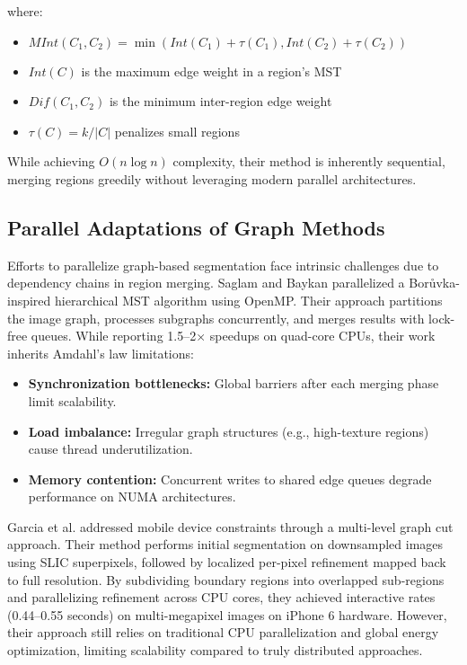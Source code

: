 \documentclass[conference]{IEEEtran}
\begin{document}
where:
\begin{itemize}
    \item $MInt(C_1, C_2) = \min(Int(C_1) + \tau(C_1), Int(C_2) + \tau(C_2))$
    \item $Int(C)$ is the maximum edge weight in a region's MST
    \item $Dif(C_1, C_2)$ is the minimum inter-region edge weight
    \item $\tau(C) = k/|C|$ penalizes small regions
\end{itemize}

While achieving $O(n\log n)$ complexity, their method is inherently sequential, merging regions greedily without leveraging modern parallel architectures.

\subsection{Parallel Adaptations of Graph Methods}
Efforts to parallelize graph-based segmentation face intrinsic challenges due to dependency chains in region merging. Saglam and Baykan \cite{Saglam2016} parallelized a Borůvka-inspired hierarchical MST algorithm using OpenMP. Their approach partitions the image graph, processes subgraphs concurrently, and merges results with lock-free queues. While reporting 1.5–2× speedups on quad-core CPUs, their work inherits Amdahl's law limitations:

\begin{itemize}
    \item \textbf{Synchronization bottlenecks:} Global barriers after each merging phase limit scalability.
    \item \textbf{Load imbalance:} Irregular graph structures (e.g., high-texture regions) cause thread underutilization.
    \item \textbf{Memory contention:} Concurrent writes to shared edge queues degrade performance on NUMA architectures.
\end{itemize}

Garcia et al. \cite{Garcia2015} addressed mobile device constraints through a multi-level graph cut approach. Their method performs initial segmentation on downsampled images using SLIC superpixels, followed by localized per-pixel refinement mapped back to full resolution. By subdividing boundary regions into overlapped sub-regions and parallelizing refinement across CPU cores, they achieved interactive rates (0.44–0.55 seconds) on multi-megapixel images on iPhone 6 hardware. However, their approach still relies on traditional CPU parallelization and global energy optimization, limiting scalability compared to truly distributed approaches.
\end{document}
